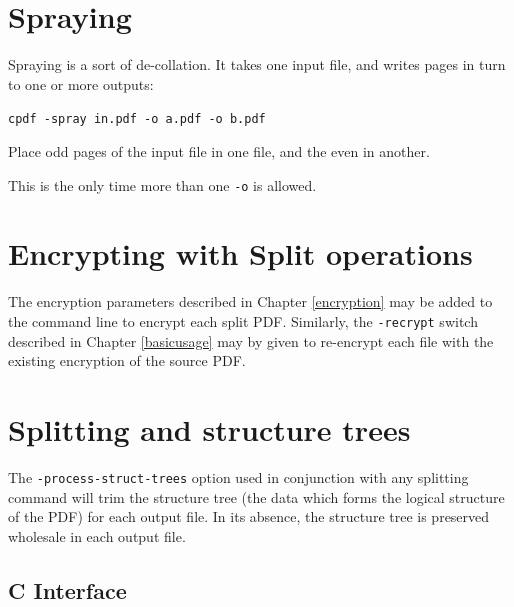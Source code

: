 \documentclass{book}
\begin{document}
\section{Spraying}

Spraying is a sort of de-collation. It takes one input file, and writes pages in turn to one or more outputs:

  \begin{framed}\small
    \noindent\verb!cpdf -spray in.pdf -o a.pdf -o b.pdf!

    \vspace{2.5mm}
    \noindent Place odd pages of the input file in one file, and the even in another.

  \end{framed}

\noindent This is the only time more than one \texttt{-o} is allowed.

\section{Encrypting with Split operations}
The encryption parameters described in Chapter \ref{encryption} may be added to the command line to encrypt each split PDF. Similarly, the \texttt{-recrypt} switch described in Chapter \ref{basicusage} may by given to re-encrypt each file with the existing encryption of the source PDF.

\section{Splitting and structure trees}

The \texttt{-process-struct-trees} option used in conjunction with any splitting command will trim the structure tree (the data which forms the logical structure of the PDF) for each output file. In its absence, the structure tree is preserved wholesale in each output file.

\pagestyle{empty}\thispagestyle{fancy}

\begin{cpdflib}
\clearpage
\section*{C Interface}
\begin{small}\tt

\end{small}
\end{cpdflib}
\end{document}
